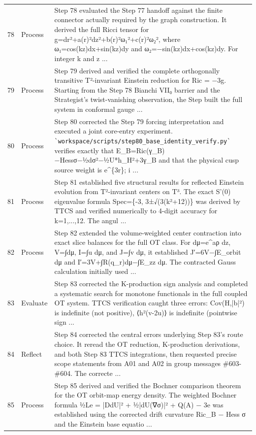 \documentclass[UTF8,fontset=fandol,zihao=-4]{ctexart}
\begin{document}
\begin{longtable}{r p{} >{\raggedright\arraybackslash}p{}}
78 & Process & Step 78 evaluated the Step 77 handoff against the finite connector actually required by the graph construction. It derived the full Ricci tensor for g=dr²+a(r)²dz²+b(r)²ω₁²+c(r)²ω₂², where ω₁=cos(kz)dx+sin(kz)dy and ω₂=−sin(kz)dx+cos(kz)dy. For integer k and z ...\\
79 & Process & Step 79 derived and verified the complete orthogonally transitive T²-invariant Einstein reduction for Ric = −3g. Starting from the Step 78 Bianchi VII₀ barrier and the Strategist's twist-vanishing observation, the Step built the full system in conformal gauge  ...\\
80 & Process & Step 80 corrected the Step 79 forcing interpretation and executed a joint core-entry experiment. \nolinkurl{`workspace/scripts/step80_base_identity_verify.py`} verifies exactly that E\_B=Ric(γ\_B)−Hessσ−½dσ²−½U*h\_H²+3γ\_B and that the physical cusp source weight is e\textasciicircum{}\{3r\}; i ...\\
81 & Process & Step 81 established five structural results for reflected Einstein evolution from T²-invariant centers on T³. The exact S'(0) eigenvalue formula Spec=\{-3, 3±√(3(k²+12))\} was derived by TTCS and verified numerically to 4-digit accuracy for k=1,...,12. The angul ...\\
82 & Process & Step 82 extended the volume-weighted center contraction into exact slice balances for the full OT class. For dμ=e\textasciicircum{}aρ dz, V=∫dμ, I=∫u dμ, and J=∫v dμ, it established J′=6V−∫E\_orbit dμ and I′=3V+∫R(q\_r)dμ−∫E\_zz dμ. The contracted Gauss calculation initially used ...\\
83 & Evaluate & Step 83 corrected the K-production sign analysis and completed a systematic search for monotone functionals in the full coupled OT system. TTCS verification caught three errors: Cov(H,|b|²) is indefinite (not positive), ⟨h²(v-2u)⟩ is indefinite (pointwise sign ...\\
84 & Reflect & Step 84 corrected the central errors underlying Step 83’s route choice. It reread the OT reduction, K-production derivations, and both Step 83 TTCS integrations, then requested precise scope statements from A01 and A02 in group messages \#603-\#604. The correcte ...\\
85 & Process & Step 85 derived and verified the Bochner comparison theorem for the OT orbit-map energy density. The weighted Bochner formula ½Le = |DdU|² + ½|dU(∇σ)|² + Q(A) − 3e was established using the corrected drift curvature Ric\_B − Hess σ and the Einstein base equatio ...\\

\end{longtable}
\end{document}
